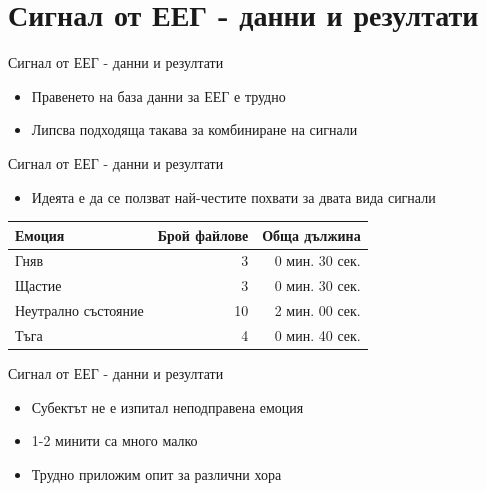\documentclass[9pt]{beamer}
\begin{document}
\section{Сигнал от ЕЕГ - данни и резултати}
    \begin{frame}[t]{Сигнал от ЕЕГ - данни и резултати}
        \begin{itemize}
            \setlength\itemsep{\fill}
            \pause
            \item Правенето на база данни за ЕЕГ е трудно
            \pause
            \item Липсва подходяща такава за комбиниране на сигнали
        \end{itemize}
    \end{frame}

    \begin{frame}[t]{Сигнал от ЕЕГ - данни и резултати}
        \begin{itemize}
            \setlength\itemsep{\fill}
            \pause
            \item Идеята е да се ползват най-честите похвати за двата вида сигнали
        \end{itemize}
        \pause
        \pause
        \begin{center}
        \begin{tabular}{|l|r|r|} 
            \hline
            Емоция & Брой файлове & Обща дължина\\ 
            \hline
            Гняв & 3 & 0 мин. 30 сек.\\ 
            Щастие & 3 & 0 мин. 30 сек.\\ 
            Неутрално състояние & 10 & 2 мин. 00 сек. \\ 
            Тъга & 4 & 0 мин. 40 сек. \\ 
            \hline
        \end{tabular}
        \end{center}
    \end{frame}

    \begin{frame}[t]{Сигнал от ЕЕГ - данни и резултати}
        \begin{itemize}
            \setlength\itemsep{\fill}
            \pause
            \item Субектът не е изпитал неподправена емоция
            \item 1-2 минити са много малко
            \item Трудно приложим опит за различни хора
        \end{itemize}
    \end{frame}
\end{document}

